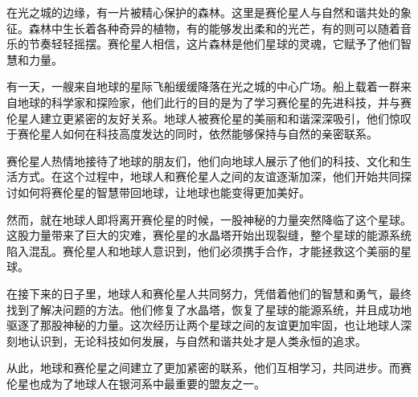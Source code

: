 \documentclass{article}
\begin{document}
在光之城的边缘，有一片被精心保护的森林。这里是赛伦星人与自然和谐共处的象征。森林中生长着各种奇异的植物，有的能够发出柔和的光芒，有的则可以随着音乐的节奏轻轻摇摆。赛伦星人相信，这片森林是他们星球的灵魂，它赋予了他们智慧和力量。

有一天，一艘来自地球的星际飞船缓缓降落在光之城的中心广场。船上载着一群来自地球的科学家和探险家，他们此行的目的是为了学习赛伦星的先进科技，并与赛伦星人建立更紧密的友好关系。地球人被赛伦星的美丽和和谐深深吸引，他们惊叹于赛伦星人如何在科技高度发达的同时，依然能够保持与自然的亲密联系。

赛伦星人热情地接待了地球的朋友们，他们向地球人展示了他们的科技、文化和生活方式。在这个过程中，地球人和赛伦星人之间的友谊逐渐加深，他们开始共同探讨如何将赛伦星的智慧带回地球，让地球也能变得更加美好。

然而，就在地球人即将离开赛伦星的时候，一股神秘的力量突然降临了这个星球。这股力量带来了巨大的灾难，赛伦星的水晶塔开始出现裂缝，整个星球的能源系统陷入混乱。赛伦星人和地球人意识到，他们必须携手合作，才能拯救这个美丽的星球。

在接下来的日子里，地球人和赛伦星人共同努力，凭借着他们的智慧和勇气，最终找到了解决问题的方法。他们修复了水晶塔，恢复了星球的能源系统，并且成功地驱逐了那股神秘的力量。这次经历让两个星球之间的友谊更加牢固，也让地球人深刻地认识到，无论科技如何发展，与自然和谐共处才是人类永恒的追求。

从此，地球和赛伦星之间建立了更加紧密的联系，他们互相学习，共同进步。而赛伦星也成为了地球人在银河系中最重要的盟友之一。
\end{document}
